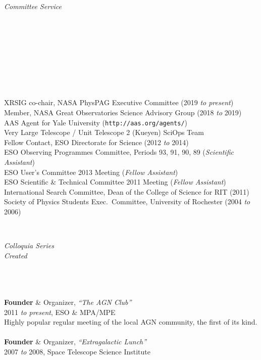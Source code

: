 \documentclass[11pt]{article}
\begin{document}
\hspace{2.5mm} \parbox{1.5in}{\textit{Committee Service\\\\\\\\\\\\\\\\\\}} \parbox{5.15in}{
XRSIG co-chair, NASA PhysPAG Executive Committee (2019 \textit{to present})\\
Member, NASA Great Observatories Science Advisory Group (2018 \textit{to} 2019)\\
AAS Agent for Yale University ({\small \texttt{http://aas.org/agents/}})\\
Very Large Telescope / Unit Telescope 2 (Kueyen) SciOps Team \\
Fellow Contact, ESO Directorate for Science (2012 \textit{to} 2014) \\
ESO Observing Programmes Committee, Periods 93, 91, 90, 89 (\textit{Scientific Assistant})\\
ESO User's Committee 2013 Meeting (\textit{Fellow Assistant})\\
ESO Scientific \& Technical Committee 2011 Meeting (\textit{Fellow Assistant})\\
International Search Committee, Dean of the College of Science for RIT (2011) \\
Society of Physics Students Exec.~Committee, University of Rochester (2004 \textit{to} 2006)}\\






\vspace{4mm}

\hspace{2.5mm} \parbox{1.5in}{\textit{Colloquia Series \\ Created\\\\\\\\} } \parbox{5.15in}{
\textbf{Founder} \& Organizer, \textit{``The AGN Club''}  \\ 2011 \textit{to present},  ESO \& MPA/MPE \\ Highly popular regular meeting of the local AGN community, the first of its kind. \\\\
\textbf{Founder} \& Organizer, \textit{``Extragalactic Lunch''} \\
2007 \textit{to} 2008, Space Telescope Science Institute} \\
\end{document}
